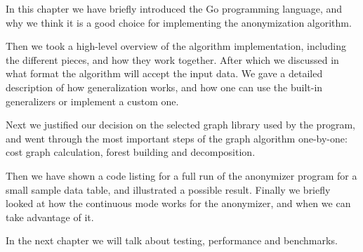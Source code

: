 In this chapter we have briefly introduced the Go programming language, and why we think it is a good choice for implementing the anonymization algorithm.

Then we took a high-level overview of the algorithm implementation, including the different pieces, and how they work together. After which we discussed in what format the algorithm will accept the input data. We gave a detailed description of how generalization works, and how one can use the built-in generalizers or implement a custom one.

Next we justified our decision on the selected graph library used by the program, and went through the most important steps of the  graph algorithm one-by-one: cost graph calculation, forest building and decomposition.

Then we have shown a code listing for a full run of the anonymizer program for a small sample data table, and illustrated a possible result. Finally we briefly looked at how the continuous mode works for the anonymizer, and when we can take advantage of it.

In the next chapter we will talk about testing, performance and benchmarks.